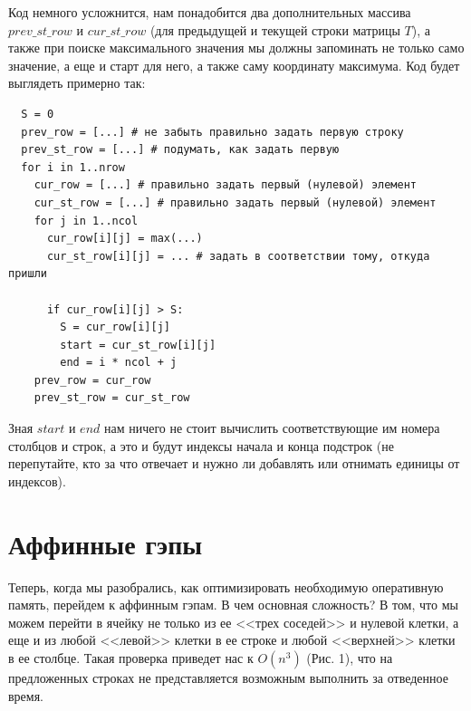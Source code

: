 \documentclass[letterpaper, 11pt]{article}
\begin{document}
Код немного усложнится, нам понадобится два дополнительных массива $prev\_st\_row$ и $cur\_st\_row$ (для предыдущей и текущей строки матрицы $T$), а также при поиске максимального значения мы должны запоминать не только само значение, а еще и старт для него, а также саму координату максимума. Код будет выглядеть примерно так:

\begin{verbatim}
  S = 0
  prev_row = [...] # не забыть правильно задать первую строку
  prev_st_row = [...] # подумать, как задать первую
  for i in 1..nrow
    cur_row = [...] # правильно задать первый (нулевой) элемент
    cur_st_row = [...] # правильно задать первый (нулевой) элемент
    for j in 1..ncol
      cur_row[i][j] = max(...)
      cur_st_row[i][j] = ... # задать в соответствии тому, откуда пришли
      
      if cur_row[i][j] > S:
        S = cur_row[i][j]
        start = cur_st_row[i][j]
        end = i * ncol + j
    prev_row = cur_row
    prev_st_row = cur_st_row
\end{verbatim}

Зная $start$ и $end$ нам ничего не стоит вычислить соответствующие им номера столбцов и строк, а это и будут индексы начала и конца подстрок (не перепутайте, кто за что отвечает и нужно ли добавлять или отнимать единицы от индексов).

\section{Аффинные гэпы}

Теперь, когда мы разобрались, как оптимизировать необходимую оперативную память, перейдем к аффинным гэпам. В чем основная сложность? В том, что мы можем перейти в ячейку не только из ее <<трех соседей>> и нулевой клетки, а еще и из любой <<левой>> клетки в ее строке и любой <<верхней>> клетки в ее столбце. Такая проверка приведет нас к $O(n^3)$ (Рис. 1), что на предложенных строках не представляется возможным выполнить за отведенное время.
\end{document}
